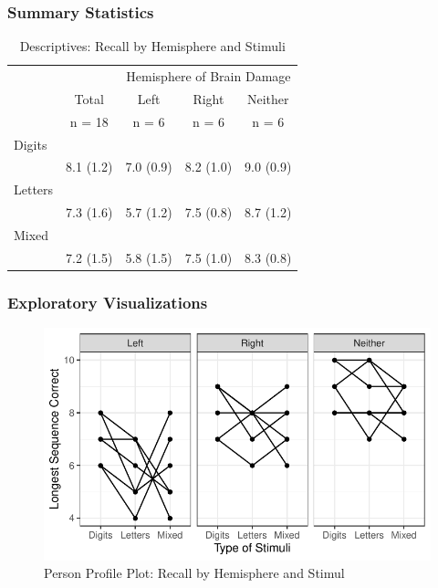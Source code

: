 \documentclass[
]{article}
\begin{document}
\hypertarget{summary-statistics-2}{%
\subsubsection{Summary Statistics}\label{summary-statistics-2}}

\begin{table}[ ht ] 
\centering 
\caption{Descriptives: Recall by Hemisphere and Stimuli}\label{}
\begin{tabular}{ l c c c c }
\toprule
 &   &  \multicolumn{ 3 }{c}{ Hemisphere of Brain Damage }\\ 
  & Total & Left & Right & Neither \\ 
 & n = 18 & n = 6 & n = 6 & n = 6 \\ 
 \midrule
Digits &   &   &   &  \\ 
\hspace{6pt}   & 8.1 (1.2) & 7.0 (0.9) & 8.2 (1.0) & 9.0 (0.9)\\ 
Letters &   &   &   &  \\ 
\hspace{6pt}   & 7.3 (1.6) & 5.7 (1.2) & 7.5 (0.8) & 8.7 (1.2)\\ 
Mixed &   &   &   &  \\ 
\hspace{6pt}   & 7.2 (1.5) & 5.8 (1.5) & 7.5 (1.0) & 8.3 (0.8)\\ 
\bottomrule

\end{tabular}
\end{table}

\clearpage

\hypertarget{exploratory-visualizations-1}{%
\subsubsection{Exploratory
Visualizations}\label{exploratory-visualizations-1}}

\begin{figure}

{\centering \includegraphics{Chapter-16-Assignment-R-Skeleton--2020spring-_files/figure-latex/unnamed-chunk-23-1} 

}

\caption{Person Profile Plot: Recall by Hemisphere and Stimul}\label{fig:unnamed-chunk-23}
\end{figure}
\end{document}
